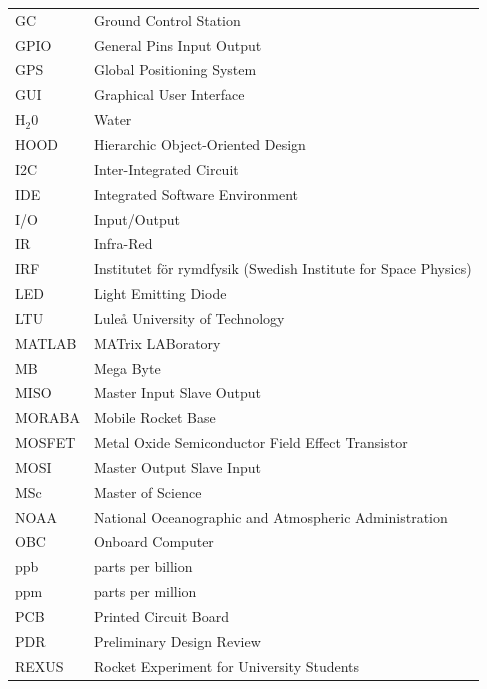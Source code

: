 \documentclass[a4paper,12pt,oneside]{article} %
\providecommand{\DIFaddbegin}{} %
\providecommand{\DIFaddend}{} %
\newcommand{\DIFaddincludegraphics}[2][]{{\color{blue}\fbox{\DIFOincludegraphics[#1]{#2}}}} %
\DeclareRobustCommand{\DIFaddbegin}{\DIFOaddbegin \let\includegraphics\DIFaddincludegraphics} %
\DeclareRobustCommand{\DIFaddend}{\DIFOaddend \let\includegraphics\DIFOincludegraphics} %
\begin{document}
\begin{longtable}{p{3cm} p{9cm}}
            GC          & Ground Control Station\\
            GPIO        & General Pins Input Output\\
            GPS         & Global Positioning System\\
            GUI         & Graphical User Interface\\
            H$_2$0      & Water \\
            HOOD        & Hierarchic Object-Oriented Design\\
            I2C         & Inter-Integrated Circuit \\
            IDE         & Integrated Software Environment \\
            I/O         & Input/Output\\
            IR          & Infra-Red\\
            IRF         & Institutet för rymdfysik (Swedish Institute for Space Physics)\\
            LED         & Light Emitting Diode\\
            LTU         & Luleå University of Technology \\
            MATLAB      & MATrix LABoratory\\
            MB          & Mega Byte\\
            MISO        & Master Input Slave Output\\
            MORABA      & Mobile Rocket Base \\
            MOSFET      & Metal Oxide Semiconductor Field Effect Transistor\DIFaddbegin \\
            \DIFaddend MOSI        & Master Output Slave Input\\
            MSc         & Master of Science \\
            NOAA        & National Oceanographic and Atmospheric Administration \\
            OBC         & Onboard Computer\\
            ppb         & parts per billion\\
            ppm         & parts per million\\
            PCB         & Printed Circuit Board\\
            PDR         & Preliminary Design Review\\
            REXUS       & Rocket Experiment for University Students \\

\end{longtable}
\end{document}
